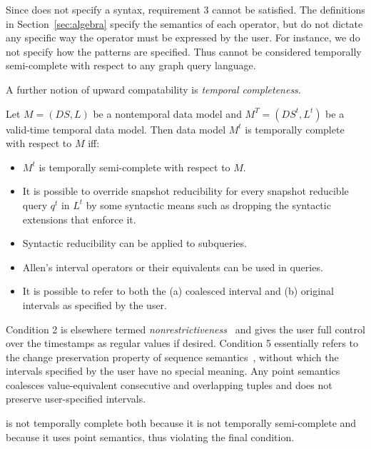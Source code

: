 Since \tga does not specify a syntax, requirement 3 cannot
  be satisfied.  The definitions in Section~\ref{sec:algebra} specify
  the semantics of each operator, but do not dictate any specific way
  the operator must be expressed by the user.  For instance, we do not
  specify how the patterns are specified.  Thus \tga cannot be
  considered temporally semi-complete with respect to any graph query
  language.

A further notion of upward compatability is {\em temporal
  completeness}.

\begin{definition}  Let $M = (DS,L)$ be a nontemporal data
model and $M^T = (DS^t,L^t)$ be a valid-time temporal data model.
Then data model $M^t$ is temporally complete with respect to $M$
iff:

\begin{itemize}[noitemsep,itemindent=\dimexpr{}+\relax,leftmargin=5pt]
\item $M^t$ is temporally semi-complete with respect to $M$.
\item It is possible to override snapshot reducibility for every
  snapshot reducible query $q^t$ in $L^t$ by some syntactic means such
  as dropping the syntactic extensions that enforce it.
\item Syntactic reducibility can be applied to subqueries.
\item Allen's interval operators or their equivalents can be used in queries.
\item It is possible to refer to both the (a) coalesced interval and (b) original intervals as specified by the user.
\end{itemize}
\end{definition}

Condition 2 is elsewhere termed {\em
  nonrestrictiveness}~\cite{Bohlen2000} and gives the user full
control over the timestamps as regular values if desired. Condition 5
essentially refers to the change preservation property of sequence
semantics~\cite{Dignos2012}, without which the intervals specified by
the user have no special meaning.  Any point semantics coalesces
value-equivalent consecutive and overlapping tuples and does not
preserve user-specified intervals.

\tga is not temporally complete both because it is not temporally
semi-complete and because it uses point semantics, thus violating the
final condition.


